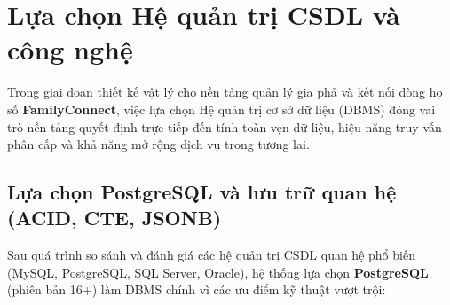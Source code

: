 \section{Lựa chọn Hệ quản trị CSDL và công nghệ}
\label{sec:3_1_lua_chon_dbms}

Trong giai đoạn thiết kế vật lý cho nền tảng quản lý gia phả và kết nối dòng họ số \textbf{FamilyConnect}, việc lựa chọn Hệ quản trị cơ sở dữ liệu (DBMS) đóng vai trò nền tảng quyết định trực tiếp đến tính toàn vẹn dữ liệu, hiệu năng truy vấn phân cấp và khả năng mở rộng dịch vụ trong tương lai.

\subsection{Lựa chọn PostgreSQL và lưu trữ quan hệ (ACID, CTE, JSONB)}

Sau quá trình so sánh và đánh giá các hệ quản trị CSDL quan hệ phổ biến (MySQL, PostgreSQL, SQL Server, Oracle), hệ thống lựa chọn \textbf{PostgreSQL} (phiên bản 16+) làm DBMS chính vì các ưu điểm kỹ thuật vượt trội:


